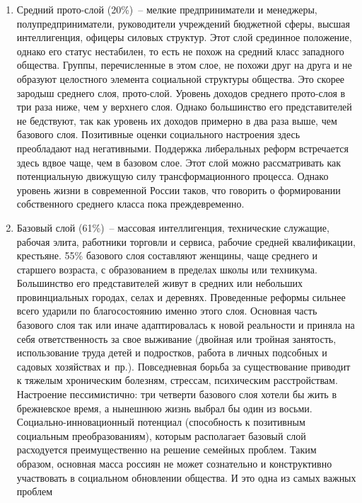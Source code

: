\begin{enumerate}
    \item Средний прото-слой (20\%)~-- мелкие предприниматели и менеджеры,
      полупредприниматели, руководители учреждений бюджетной сферы, высшая
      интеллигенция, офицеры силовых структур. Этот слой срединное положение,
      однако его статус нестабилен, то есть не похож на средний класс западного
      общества. Группы, перечисленные в этом слое, не похожи друг на друга и не
      образуют целостного элемента социальной структуры общества. Это скорее
      зародыш среднего слоя, прото-слой. Уровень доходов среднего прото-слоя в
      три раза ниже, чем у верхнего слоя. Однако большинство его представителей
      не бедствуют, так как уровень их доходов примерно в два раза выше, чем
      базового слоя. Позитивные оценки социального настроения здесь преобладают
      над негативными. Поддержка либеральных реформ встречается здесь вдвое
      чаще, чем в базовом слое. Этот слой можно рассматривать как потенциальную
      движущую силу трансформационного процесса. Однако уровень жизни в
      современной России таков, что говорить о формировании собственного
      среднего класса пока преждевременно.
    \item Базовый слой (61\%)~-- массовая интеллигенция, технические служащие,
      рабочая элита, работники торговли и сервиса, рабочие средней
      квалификации, крестьяне. 55\% базового слоя составляют женщины, чаще
      среднего и старшего возраста, с образованием в пределах школы или
      техникума. Большинство его представителей живут в средних или небольших
      провинциальных городах, селах и деревнях. Проведенные реформы сильнее
      всего ударили по благосостоянию именно этого слоя. Основная часть
      базового слоя так или иначе адаптировалась к новой реальности и приняла
      на себя ответственность за свое выживание (двойная или тройная занятость,
      использование труда детей и подростков, работа в личных подсобных и
      садовых хозяйствах и~пр.). Повседневная борьба за существование приводит
      к тяжелым хроническим болезням, стрессам, психическим расстройствам.
      Настроение пессимистично: три четверти базового слоя хотели бы жить в
      брежневское время, а нынешнюю жизнь выбрал бы один из восьми.
      Социально-инновационный потенциал (способность к позитивным социальным
      преобразованиям), которым располагает базовый слой расходуется
      преимущественно на решение семейных проблем. Таким образом, основная
      масса россиян не может сознательно и конструктивно участвовать в
      социальном обновлении общества. И это одна из самых важных проблем

\end{enumerate}
